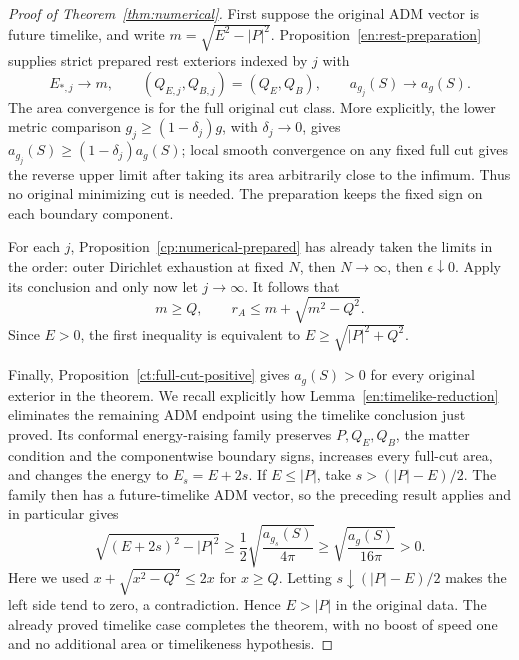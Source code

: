 \begin{proof}[Proof of Theorem~\ref{thm:numerical}]
First suppose the original ADM vector is future timelike, and write
$m=\sqrt{E^2-|P|^2}$.  Proposition~\ref{en:rest-preparation} supplies
strict prepared rest exteriors indexed by $j$ with
\[
 E_{*,j}\longrightarrow m,\qquad
 (Q_{E,j},Q_{B,j})=(Q_E,Q_B),\qquad
 a_{g_j}(S)\longrightarrow a_g(S).
\]
The area convergence is for the full original cut class.  More
explicitly, the lower metric comparison
$g_j\ge(1-\delta_j)g$, with $\delta_j\to0$, gives
$a_{g_j}(S)\ge(1-\delta_j)a_g(S)$; local smooth convergence on any
fixed full cut gives the reverse upper limit after taking its area
arbitrarily close to the infimum.  Thus no original minimizing cut
is needed.  The preparation keeps the fixed sign on each boundary
component.

For each $j$, Proposition~\ref{cp:numerical-prepared} has already
taken the limits in the order: outer Dirichlet exhaustion at fixed
$N$, then $N\to\infty$, then $\epsilon\downarrow0$.  Apply its
conclusion and only now let $j\to\infty$.  It follows that
\[
 m\ge Q,\qquad
 r_A\le m+\sqrt{m^2-Q^2}.
\]
Since $E>0$, the first inequality is equivalent to
$E\ge\sqrt{|P|^2+Q^2}$.

Finally, Proposition~\ref{ct:full-cut-positive} gives $a_g(S)>0$ for every
original exterior in the theorem.  We recall explicitly how
Lemma~\ref{en:timelike-reduction} eliminates the remaining ADM
endpoint using the timelike conclusion just proved.  Its conformal
energy-raising family preserves $P,Q_E,Q_B$, the matter condition
and the componentwise boundary signs, increases every full-cut
area, and changes the energy to $E_s=E+2s$.  If $E\le|P|$, take
$s>(|P|-E)/2$.  The family then has a future-timelike ADM vector, so
the preceding result applies and in particular gives
\[
 \sqrt{(E+2s)^2-|P|^2}
 \ge\frac12\sqrt{\frac{a_{g_s}(S)}{4\pi}}
 \ge\sqrt{\frac{a_g(S)}{16\pi}}>0.
\]
Here we used $x+\sqrt{x^2-Q^2}\le2x$ for $x\ge Q$.  Letting
$s\downarrow(|P|-E)/2$ makes the left side tend to zero, a
contradiction.  Hence $E>|P|$ in the original data.  The already
proved timelike case completes the theorem, with no boost of speed
one and no additional area or timelikeness hypothesis.
\end{proof}
